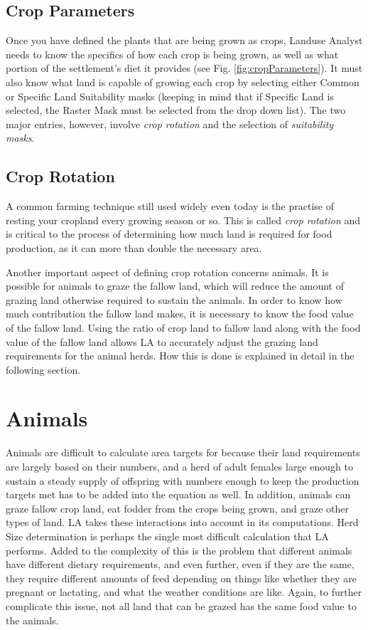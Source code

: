   \subsection{Crop Parameters}
  \label{cropParameters}
  Once you have defined the plants that are being grown as crops, Landuse
  Analyst needs to know the specifics of how each crop is being grown, as well
  as what portion of the settlement's diet it provides (see Fig.
  \ref{fig:cropParameters}).  It must also know what land is capable of growing
  each crop by selecting either Common or Specific Land Suitability masks
  (keeping in mind that if Specific Land is selected, the Raster Mask must be
  selected from the drop down list).  The two major entries, however, involve
  \textit{crop rotation} and the selection of \textit{suitability masks}.

    \subsection{Crop Rotation}
    \label{cropRotation}
    A common farming technique still used widely even today is the practise of
    resting your cropland every growing season or so.  This is called
    \textit{crop rotation} and is critical to the process of determining how
    much land is required for food production, as it can more than double the
    necessary area. 

    Another important aspect of defining crop rotation concerns animals.  It is
    possible for animals to graze the fallow land, which will reduce the amount
    of grazing land otherwise required to sustain the animals.  In order to
    know how much contribution the fallow land makes, it is necessary to know
    the food value of the fallow land.  Using the ratio of crop land to fallow
    land along with the food value of the fallow land allows LA to
    accurately adjust the grazing land requirements for the animal herds.  How
    this is done is explained in detail in the following section.

\section{Animals}
Animals are difficult to calculate area targets for because their land
requirements are largely based on their numbers, and a herd of adult
females large enough to sustain a steady supply of offspring with numbers
enough to keep the production targets met has to be added into the equation as
well.  In addition, animals can graze fallow crop land, eat fodder from
the crops being grown, and graze other types of land.  LA takes these
interactions into account in its computations.
Herd Size determination is perhaps the single most difficult calculation that
LA performs.  Added to the complexity of this is the problem that different
animals have different dietary requirements, and even further, even if they
are the same, they require different amounts of feed depending on things like
whether they are pregnant or lactating, and what the weather conditions are
like.  Again, to further complicate this issue, not all land that can be
grazed has the same food value to the animals.

